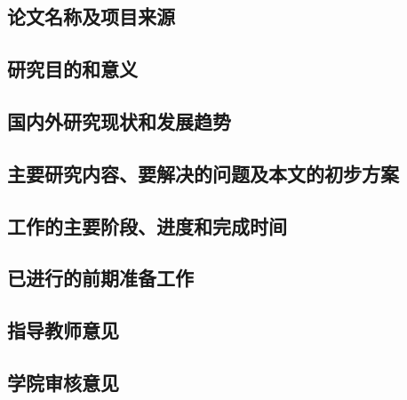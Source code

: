 \documentclass{xduugtp}
\begin{document}
\begin{mcly}
\section{论文名称及项目来源}
\end{mcly}
\begin{yjmdyy}
\section{研究目的和意义}
\end{yjmdyy}
\begin{yjxz}
\section{国内外研究现状和发展趋势}
\end{yjxz}
\begin{yjnr}
\section{主要研究内容、要解决的问题及本文的初步方案}
\end{yjnr}
\begin{gzjd}
\section{工作的主要阶段、进度和完成时间}
\end{gzjd}
\begin{zbgz}
\section{已进行的前期准备工作}
\end{zbgz}
\begin{zdjsyj}
\section{指导教师意见}
\end{zdjsyj}
\begin{xyshyj}
\section{学院审核意见}
\end{xyshyj}
\end{document}
